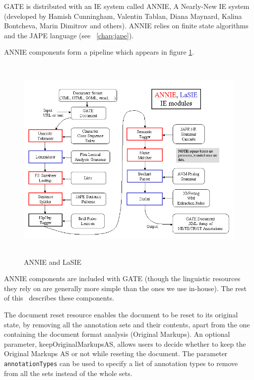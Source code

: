 GATE is distributed with an IE system called ANNIE,
A Nearly-New IE system (developed by Hamish Cunningham,
Valentin Tablan, Diana Maynard, Kalina Bontcheva, Marin Dimitrov and
others).  ANNIE relies on finite state algorithms and the
JAPE language (see \Chapthing~\ref{chap:jape}).

ANNIE components form a pipeline which appears in figure \ref{fig:annie1}.
%
\begin{figure}[htbp]
\begin{center}
\includegraphics[height=4in]{annie.png}
\end{center}
\caption{ANNIE and LaSIE}
\label{fig:annie1}
\end{figure}
%
ANNIE components are included with GATE (though the linguistic resources they
rely on are generally more simple than the ones we use in-house). The rest of
this \chapthing\ describes these components.


The document reset resource enables the document to be reset to its
original state, by removing all the annotation sets and their
contents, apart from the one containing the document format analysis
(Original Markups). An optional parameter, keepOriginalMarkupsAS, allows users
to decide whether to keep the Original Markups AS or not while reseting the
document. The parameter \texttt{annotationTypes} can be used to specify
a list of annotation types to remove from all the sets instead of the
whole sets. 

